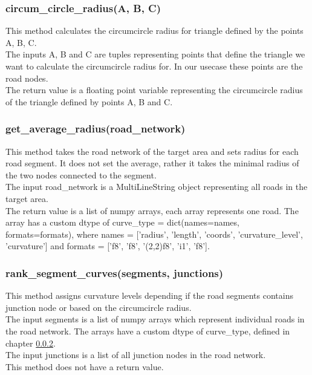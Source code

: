 \documentclass[oneside]{article}
\begin{document}
            \subsubsection{circum\_circle\_radius(A, B, C)}
            This method calculates the circumcircle radius for triangle defined by the points A, B, C.\\
            The inputs A, B and C are tuples representing points that define the triangle we want to calculate the circumcircle radius for. In our usecase these points are the road nodes.\\
            The return value is a floating point variable representing the circumcircle radius of the triangle defined by points A, B and C.

            \subsubsection{get\_average\_radius(road\_network)}
            \label{sec:dtype}
            This method takes the road network of the target area and sets radius for each road segment. It does not set the average, rather it takes the minimal radius of the two nodes connected to the segment.\\
            The input road\_network is a MultiLineString object representing all roads in the target area.\\
            The return value is a list of numpy arrays, each array represents one road. The array has a custom dtype of curve\_type = dict(names=names, formats=formats), where names = ['radius', 'length', 'coords', 'curvature\_level', 'curvature'] and formats = ['f8', 'f8', '(2,2)f8', 'i1', 'f8'].

            \subsubsection{rank\_segment\_curves(segments, junctions)}
            This method assigns curvature levels depending if the road segments contains junction node or based on the circumcircle radius.\\
            The input segments is a list of numpy arrays which represent individual roads in the road network. The arrays have a custom dtype of curve\_type, defined in chapter \ref{sec:dtype}.\\
            The input junctions is a list of all junction nodes in the road network.\\
            This method does not have a return value.
\end{document}
